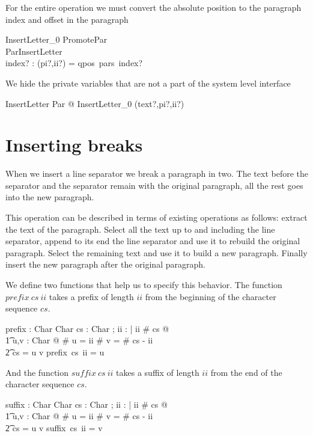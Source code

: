 \documentclass{article}
\begin{document}
For the entire operation we must convert the absolute position to the paragraph index and offset in the paragraph

\begin{schema}{InsertLetter\_0}
	PromotePar \\
	ParInsertLetter \\
	index? : \nat
\where
	(pi?,ii?) = qpos~pars~index? 
\end{schema}

We hide the private variables that are not a part of the system level interface

\begin{zed}
InsertLetter  \exists Par @ InsertLetter\_0 \hide (text?,pi?,ii?)
\end{zed}

\section{Inserting breaks}

When we insert a line separator we break a paragraph in two. The text before the separator and the separator remain with the original paragraph, all the rest goes into the new paragraph. 

This operation can be described in terms of existing operations as follows: extract the text of the paragraph. Select all the text up to and including the line separator, append to its end the line separator and use it to rebuild the original paragraph. Select the remaining text and use it to build a new paragraph. Finally insert the new paragraph after the original paragraph.

We define two functions that help us to specify this behavior. The function $prefix~cs~ii$ takes a prefix of length $ii$ from the beginning of the character sequence $cs$.

\begin{axdef}
	prefix : \seq Char \fun \nat \pfun \seq Char
\where
	\forall cs : \seq Char ; ii : \nat | ii \leq \# cs @ \\
	\t1 \exists u,v : \seq Char @ \# u = ii \land \# v = \# cs - ii \land {} \\
	\t2		cs = u \cat v \land prefix~cs~ii = u
\end{axdef}

And the function $suffix~cs~ii$ takes a suffix of length $ii$ from the end of the character sequence $cs$.

\begin{axdef}
	suffix : \seq Char \fun \nat \pfun \seq Char
\where
	\forall cs : \seq Char ; ii : \nat | ii \leq \# cs @ \\
	\t1 \exists u,v : \seq Char @ \# u = ii \land \# v = \# cs - ii \land {} \\
	\t2		cs = u \cat v \land suffix~cs~ii = v
\end{axdef}
\end{document}

